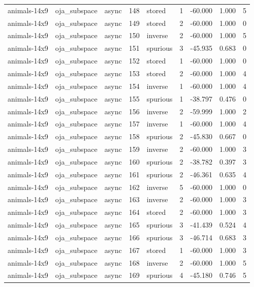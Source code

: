\begin{tabular}{lllrlrrrr}
animals-14x9 & oja\_subspace & async & 148 & stored & 1 & -60.000 & 1.000 & 5 \\
animals-14x9 & oja\_subspace & async & 149 & stored & 2 & -60.000 & 1.000 & 0 \\
animals-14x9 & oja\_subspace & async & 150 & inverse & 2 & -60.000 & 1.000 & 5 \\
animals-14x9 & oja\_subspace & async & 151 & spurious & 3 & -45.935 & 0.683 & 0 \\
animals-14x9 & oja\_subspace & async & 152 & stored & 1 & -60.000 & 1.000 & 0 \\
animals-14x9 & oja\_subspace & async & 153 & stored & 2 & -60.000 & 1.000 & 4 \\
animals-14x9 & oja\_subspace & async & 154 & inverse & 1 & -60.000 & 1.000 & 4 \\
animals-14x9 & oja\_subspace & async & 155 & spurious & 1 & -38.797 & 0.476 & 0 \\
animals-14x9 & oja\_subspace & async & 156 & inverse & 2 & -59.999 & 1.000 & 2 \\
animals-14x9 & oja\_subspace & async & 157 & inverse & 1 & -60.000 & 1.000 & 4 \\
animals-14x9 & oja\_subspace & async & 158 & spurious & 2 & -45.830 & 0.667 & 0 \\
animals-14x9 & oja\_subspace & async & 159 & inverse & 2 & -60.000 & 1.000 & 3 \\
animals-14x9 & oja\_subspace & async & 160 & spurious & 2 & -38.782 & 0.397 & 3 \\
animals-14x9 & oja\_subspace & async & 161 & spurious & 2 & -46.361 & 0.635 & 4 \\
animals-14x9 & oja\_subspace & async & 162 & inverse & 5 & -60.000 & 1.000 & 0 \\
animals-14x9 & oja\_subspace & async & 163 & inverse & 2 & -60.000 & 1.000 & 3 \\
animals-14x9 & oja\_subspace & async & 164 & stored & 2 & -60.000 & 1.000 & 3 \\
animals-14x9 & oja\_subspace & async & 165 & spurious & 3 & -41.439 & 0.524 & 4 \\
animals-14x9 & oja\_subspace & async & 166 & spurious & 3 & -46.714 & 0.683 & 3 \\
animals-14x9 & oja\_subspace & async & 167 & stored & 1 & -60.000 & 1.000 & 3 \\
animals-14x9 & oja\_subspace & async & 168 & inverse & 2 & -60.000 & 1.000 & 5 \\
animals-14x9 & oja\_subspace & async & 169 & spurious & 4 & -45.180 & 0.746 & 5 \\

\end{tabular}
